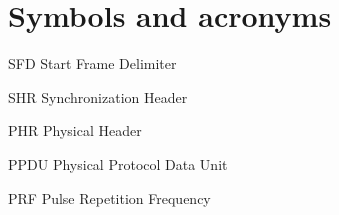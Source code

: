 \documentclass[\main/main.tex]{subfiles}
\begin{document}
\chapter*{Symbols and acronyms}
\begin{abbrv}
    \item[SFD]  Start Frame Delimiter
    \item[SHR]  Synchronization Header
    \item[PHR]  Physical Header
    \item[PPDU] Physical Protocol Data Unit
    \item[PRF]  Pulse Repetition Frequency
\end{abbrv}
\end{document}
